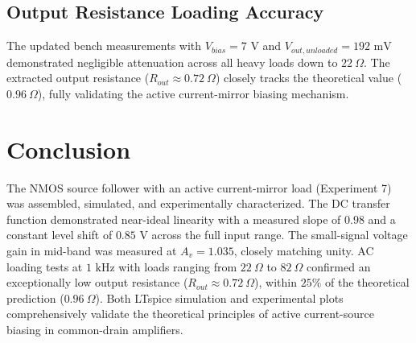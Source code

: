 \documentclass[11pt,a4paper]{article}
\begin{document}
\subsection{Output Resistance Loading Accuracy}
The updated bench measurements with $V_{bias} = 7\text{ V}$ and $V_{out,unloaded} = 192\text{ mV}$ demonstrated negligible attenuation across all heavy loads down to $22\ \Omega$. The extracted output resistance ($R_{out} \approx 0.72\ \Omega$) closely tracks the theoretical value ($0.96\ \Omega$), fully validating the active current-mirror biasing mechanism.

\section{Conclusion}
The NMOS source follower with an active current-mirror load (Experiment 7) was assembled, simulated, and experimentally characterized. The DC transfer function demonstrated near-ideal linearity with a measured slope of $0.98$ and a constant level shift of $0.85\text{ V}$ across the full input range. The small-signal voltage gain in mid-band was measured at $A_v = 1.035$, closely matching unity. AC loading tests at $1\text{ kHz}$ with loads ranging from $22\ \Omega$ to $82\ \Omega$ confirmed an exceptionally low output resistance ($R_{out} \approx 0.72\ \Omega$), within $25\%$ of the theoretical prediction ($0.96\ \Omega$). Both LTspice simulation and experimental plots comprehensively validate the theoretical principles of active current-source biasing in common-drain amplifiers.
\end{document}
